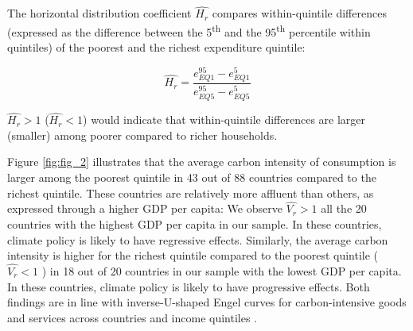 \documentclass[12pt, a4paper]{article}
\begin{document}
The horizontal distribution coefficient $\widehat{H_{r}}$ compares within-quintile differences (expressed as the difference between the 5\textsuperscript{th} and the 95\textsuperscript{th} percentile within quintiles) of the poorest and the richest expenditure quintile:

\begin{equation}
    \widehat{H_{r}} = \frac{e_{EQ1}^{95} - e_{EQ1}^{5}}{e_{EQ5}^{95} - e_{EQ5}^{5}}
\end{equation}

$\widehat{H_{r}}>1$ ($\widehat{H_{r}}<1$) would indicate that within-quintile differences are larger (smaller) among poorer compared to richer households.

Figure \ref{fig:fig_2} illustrates that the average carbon intensity of consumption is larger among the poorest quintile in 43 out of 88 countries compared to the richest quintile. These countries are relatively more affluent than others, as expressed through a higher GDP per capita: We observe $\widehat{V_{r}}>1$ all the 20 countries with the highest GDP per capita in our sample. In these countries, climate policy is likely to have regressive effects. Similarly, the average carbon intensity is higher for the richest quintile compared to the poorest quintile ($\widehat{V_{r}}<1$ ) in 18 out of 20 countries in our sample with the lowest GDP per capita. In these countries, climate policy is likely to have progressive effects. Both findings are in line with inverse-U-shaped Engel curves for carbon-intensive goods and services across countries and income quintiles \autocite{Dorband.2019}. 
\end{document}
